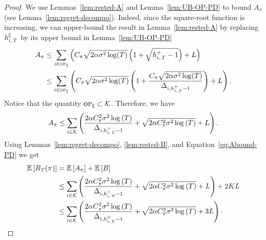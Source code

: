 \begin{proof}
We use Lemmas~\ref{lem:rested-A} and Lemma~\ref{lem:UB-OP-PD} to bound $A_\pi$ (see Lemma~\ref{lem:regret-decompo}). Indeed, since the square-root function is increasing, we can upper-bound the result in Lemma~\ref{lem:rested-A} by replacing $h_{i,\,T}^\xi$ by its upper bound in Lemma~\ref{lem:UB-OP-PD}
\begin{align*}
A_{\pi} &\leq \sum_{i\in \textsc{op}_\xi} \left(C_\pi\sqrt{2\alpha\sigma^2\log(T)} \left( 1 + \sqrt{h_{i,\,T}^+ - 1}\right) + L\right)\\
& \leq \sum_{i\in \textsc{op}_\xi} \left(C_\pi\sqrt{2\alpha\sigma^2\log(T)} \left( 1 + \frac{C_\pi\sqrt{2\alpha\sigma^2\log(T)}}{\Delta_{i,h_{i,\,T}^+-1}}\right) + L\right). 
\end{align*}
Notice that the quantity $\textsc{op}_\xi \subset \mathcal{K}$. Therefore, we have 
\begin{equation}
\label{eq:Abound-PD}
A_{\pi} \leq \sum_{i\in \mathcal{K}} \left(\frac{2\alpha C_\pi^2\sigma^2\log\left(T\right)}{\Delta_{i,h_{i,\,T}^+-1}} + \sqrt{2\alpha C_\pi^2\sigma^2\log\left(T\right)} +L \right). 
\end{equation}
Using Lemmas~\ref{lem:regret-decompo}, \ref{lem:rested-B}, and Equation~\ref{eq:Abound-PD} we get
\begin{align*}
\EE{\regret(\pi)} &=\EE{A_{\pi}} + \EE B 
\\&
\leq \sum_{i\in \arms} \pa{\frac{2\alpha C_\pi^2\sigma^2\log\pa{T}}{\Delta_{i,\hiT^+-1}} + \sqrt{2\alpha C_\pi^2\sigma^2\log\pa{T}} +L } + 2KL \\
&\leq \sum_{i\in \arms} \pa{\frac{2\alpha C_\pi^2\sigma^2\log\pa{T}}{\Delta_{i,\hiT^+-1}} + \sqrt{2\alpha C_\pi^2\sigma^2\log\pa{T}} +3L } \cdot
\end{align*}
\end{proof}





